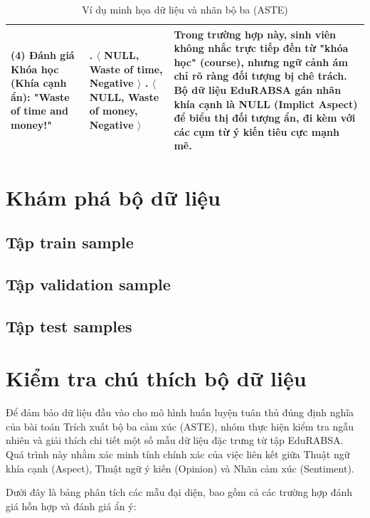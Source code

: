 \documentclass[12pt,a4paper]{report}
\begin{document}
\begin{table}[h!]
\begin{tabularx}{\textwidth}{ 
    >{\hsize=0.8\hsize}X 
    >{\hsize=0.8\hsize}X 
    >{\hsize=1.4\hsize}X 
}
\midrule
(4) Đánh giá Khóa học (Khía cạnh ẩn): "Waste of time and money!" & 
1. $\langle$ NULL, Waste of time, Negative $\rangle$ \newline 
2. $\langle$ NULL, Waste of money, Negative $\rangle$ \newline
& Trong trường hợp này, sinh viên không nhắc trực tiếp đến từ "khóa học" (course), nhưng ngữ cảnh ám chỉ rõ ràng đối tượng bị chê trách. Bộ dữ liệu EduRABSA gán nhãn khía cạnh là NULL (Implict Aspect) để biểu thị đối tượng ẩn, đi kèm với các cụm từ ý kiến tiêu cực mạnh mẽ.\\ 


\bottomrule
\end{tabularx}
\caption{Ví dụ minh họa dữ liệu và nhãn bộ ba (ASTE)}
\end{table}



\section{Khám phá bộ dữ liệu}
\subsection{Tập train sample}

\subsection{Tập validation sample}

\subsection{Tập test samples}


\section{Kiểm tra chú thích bộ dữ liệu}
Để đảm bảo dữ liệu đầu vào cho mô hình huấn luyện tuân thủ đúng định nghĩa của bài toán Trích xuất bộ ba cảm xúc (ASTE), nhóm thực hiện kiểm tra ngẫu nhiên và giải thích chi tiết một số mẫu dữ liệu đặc trưng từ tập EduRABSA. Quá trình này nhằm xác minh tính chính xác của việc liên kết giữa Thuật ngữ khía cạnh (Aspect), Thuật ngữ ý kiến (Opinion) và Nhãn cảm xúc (Sentiment).

Dưới đây là bảng phân tích các mẫu đại diện, bao gồm cả các trường hợp đánh giá hỗn hợp và đánh giá ẩn ý:

\begingroup %
\renewcommand{\arraystretch}{1.5} %
\small %
\end{document}
